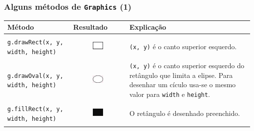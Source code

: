 \documentclass[xcolor={dvipsnames,table},aspectratio=169]{beamer}
\begin{document}
\begin{frame}[fragile]\frametitle{Alguns métodos de \texttt{Graphics} (1)}
{\scriptsize
\begin{center}
  \begin{tabular}{|p{6cm}|p{3cm}|p{4cm}|}
\hline
    \textbf{Método} & \textbf{Resultado} & \textbf{Explicação} \\
\hline
\texttt{g.drawRect(x, y, width, height)}
&
\begin{figure}[h]
	\includegraphics[height=0.1\paperheight,center]{pucrs-ep-fprog-unidade_04-graficos_em_java-laminas-retangulo.png}
\end{figure}
& \texttt{(x, y)} é o canto superior esquerdo.\\
\hline
\texttt{g.drawOval(x, y, width, height)}
&
\begin{figure}[h]
	\includegraphics[height=0.1\paperheight,center]{pucrs-ep-fprog-unidade_04-graficos_em_java-laminas-elipse.png}
\end{figure}
& \texttt{(x, y)} é o canto superior esquerdo do retângulo que limita a elipse. Para desenhar um cículo usa-se o mesmo valor para \texttt{width} e \texttt{height}.\\
\hline
\texttt{g.fillRect(x, y, width, height)}
&
\begin{figure}[h]
	\includegraphics[height=0.1\paperheight,center]{pucrs-ep-fprog-unidade_04-graficos_em_java-laminas-retangulo_preenchido.png}
\end{figure}
& O retângulo é desenhado preenchido.\\
\hline
  \end{tabular}
\end{center}
}
\end{frame}
\end{document}
